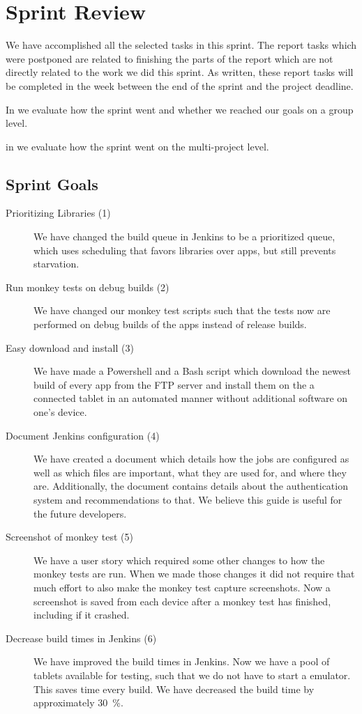 \chapter{Sprint Review}\label{chap:sprint4_end}
We have accomplished all the selected tasks in this sprint. The report tasks which were postponed are related to finishing the parts of the report which are not directly related to the work we did this sprint. As written, these report tasks will be completed in the week between the end of the sprint and the project deadline.

\begin{chapterorganization}
    \item In  we evaluate how the sprint went and whether we reached our goals on a group level.
    \item in  we evaluate how the sprint went on the multi-project level.
\end{chapterorganization}

\section{Sprint Goals}\label{sec:s4_goals}
\begin{description}
    \item[Prioritizing Libraries (1)] We have changed the build queue in Jenkins to be a prioritized queue, which uses scheduling that favors libraries over apps, but still prevents starvation.
    \item[Run monkey tests on debug builds (2)] We have changed our monkey test scripts such that the tests now are performed on debug builds of the apps instead of release builds.
    \item[Easy download and install (3)] We have made a Powershell and a Bash script which download the newest build of every app from the FTP server and install them on the a connected tablet in an automated manner without additional software on one's device.
    \item[Document Jenkins configuration (4)] We have created a document which details how the jobs are configured as well as which files are important, what they are used for, and where they are. Additionally, the document contains details about the authentication system and recommendations to that. We believe this guide is useful for the future developers.
    \item[Screenshot of monkey test (5)] We have a user story which required some other changes to how the monkey tests are run. When we made those changes it did not require that much effort to also make the monkey test capture screenshots. Now a screenshot is saved from each device after a monkey test has finished, including if it crashed.
    \item[Decrease build times in Jenkins (6)] We have improved the build times in Jenkins. Now we have a pool of tablets available for testing, such that we do not have to start a emulator. This saves time every build. We have decreased the build time by approximately \SI{30}{\percent}.
\end{description}
